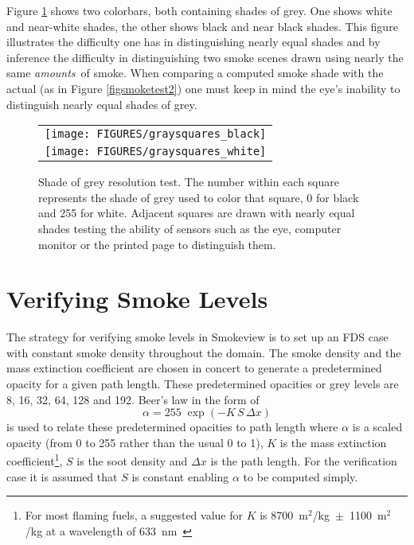 \documentclass[11pt,twoside]{book}
\newcommand{\figoptions}{hbp}
\begin{document}
Figure \ref{figgraysquare} shows two colorbars, both containing shades of grey.  One shows white and
near-white shades, the other shows black and near black shades.  This figure illustrates the difficulty one has in distinguishing nearly equal shades and by inference the difficulty in distinguishing two smoke scenes drawn using nearly the same {\em amounts}\ of smoke.  When comparing a computed smoke shade with the actual (as in Figure \ref{figsmoketest2}) one must keep in mind the eye's inability to distinguish nearly equal shades of grey.

\begin{figure}[\figoptions]
\begin{center}
 \centering
\begin{tabular}{c}
\texttt{[image: FIGURES/graysquares\_black]}\\
\texttt{[image: FIGURES/graysquares\_white]}\\
 \end{tabular}
\end{center}
 \caption[Shade of grey resolution test.]{Shade of grey resolution test.
 The number within each square represents the shade of grey used to color that square,
 0 for black and 255 for white.  Adjacent squares are drawn with nearly equal shades
 testing the ability of sensors such as the eye, computer monitor or the printed page
 to distinguish them.
 }
\label{figgraysquare}%
\end{figure}

\section{Verifying Smoke Levels}

The strategy for verifying smoke levels in Smokeview is to set up an FDS case with constant smoke density throughout the domain.  The smoke density and the mass extinction coefficient are chosen in concert to generate a predetermined opacity for a given path length.   These predetermined opacities or grey levels are 8, 16, 32, 64, 128 and 192.  Beer's law in the form of
\begin{equation}
\alpha = 255 \; \exp(-K \, S \, \Delta x)
\label{Beers}
\end{equation}
is used to relate these predetermined opacities to path length where $\alpha$ is a scaled opacity (from 0 to 255 rather than the usual 0 to 1),
$K$ is the mass extinction coefficient\footnote{For most flaming fuels, a suggested value for $K$ is
8700~m$^2$/kg~$\pm$~1100~m$^2$/kg at a
wavelength of 633~nm~\cite{Mulholland:F+M}},
$S$ is the soot density and $\Delta x$ is the path length.  For the verification case it is assumed that $S$ is constant enabling $\alpha$ to be computed simply.
\end{document}
